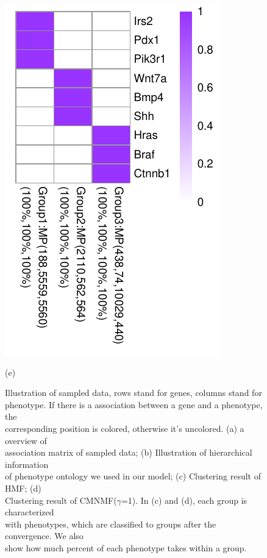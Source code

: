 \documentclass{bmcart}
\begin{document}
\begin{figure}[!h]
\begin{minipage}{.3\linewidth}
   \includegraphics[width=\linewidth]{DrawPictures/v4.pdf}
    \centerline{(e)}
  \end{minipage}
  \caption{Illustration of sampled data, rows stand for genes, columns stand for \protect\\
  phenotype. If there is a association between a gene and a phenotype, the \protect \\
  corresponding position is colored, otherwise it's uncolored. (a) a overview of \protect \\
  association matrix of sampled data; (b) Illustration of hierarchical information \protect \\
  of phenotype ontology we used in our model; (c) Clustering result of HMF; (d)\protect \\
  Clustering result of CMNMF($\gamma$=1). In (c) and (d), each group is characterized \protect \\
  with phenotypes, which are classified to groups after the convergence. We also \protect \\
  show how much percent of each phenotype takes within a group.}
  \label{fig:sampled_result}
\end{figure}
\end{document}
